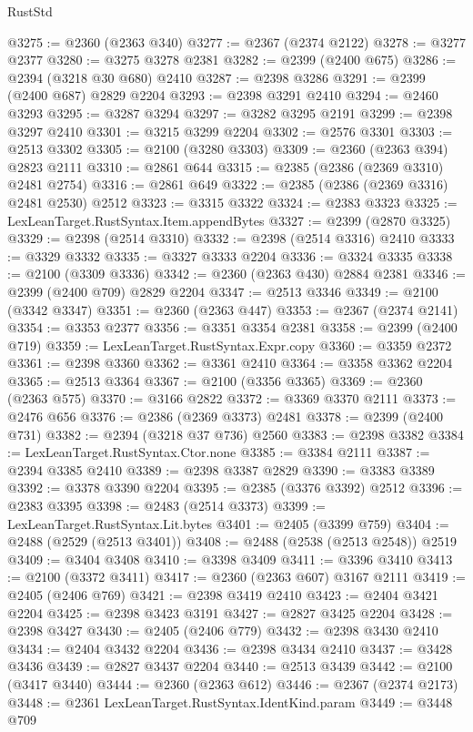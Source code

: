 \begin{lexlean}{RustStd}
\begin{coremodule}
@3275 := @2360 (@2363 @340)
@3277 := @2367 (@2374 @2122)
@3278 := @3277 @2377
@3280 := @3275 @3278 @2381
@3282 := @2399 (@2400 @675)
@3286 := @2394 (@3218 @30 @680) @2410
@3287 := @2398 @3286
@3291 := @2399 (@2400 @687) @2829 @2204
@3293 := @2398 @3291 @2410
@3294 := @2460 @3293
@3295 := @3287 @3294
@3297 := @3282 @3295 @2191
@3299 := @2398 @3297 @2410
@3301 := @3215 @3299 @2204
@3302 := @2576 @3301
@3303 := @2513 @3302
@3305 := @2100 (@3280 @3303)
@3309 := @2360 (@2363 @394) @2823 @2111
@3310 := @2861 @644
@3315 := @2385 (@2386 (@2369 @3310) @2481 @2754)
@3316 := @2861 @649
@3322 := @2385 (@2386 (@2369 @3316) @2481 @2530) @2512
@3323 := @3315 @3322
@3324 := @2383 @3323
@3325 := LexLeanTarget.RustSyntax.Item.appendBytes
@3327 := @2399 (@2870 @3325)
@3329 := @2398 (@2514 @3310)
@3332 := @2398 (@2514 @3316) @2410
@3333 := @3329 @3332
@3335 := @3327 @3333 @2204
@3336 := @3324 @3335
@3338 := @2100 (@3309 @3336)
@3342 := @2360 (@2363 @430) @2884 @2381
@3346 := @2399 (@2400 @709) @2829 @2204
@3347 := @2513 @3346
@3349 := @2100 (@3342 @3347)
@3351 := @2360 (@2363 @447)
@3353 := @2367 (@2374 @2141)
@3354 := @3353 @2377
@3356 := @3351 @3354 @2381
@3358 := @2399 (@2400 @719)
@3359 := LexLeanTarget.RustSyntax.Expr.copy
@3360 := @3359 @2372
@3361 := @2398 @3360
@3362 := @3361 @2410
@3364 := @3358 @3362 @2204
@3365 := @2513 @3364
@3367 := @2100 (@3356 @3365)
@3369 := @2360 (@2363 @575)
@3370 := @3166 @2822
@3372 := @3369 @3370 @2111
@3373 := @2476 @656
@3376 := @2386 (@2369 @3373) @2481
@3378 := @2399 (@2400 @731)
@3382 := @2394 (@3218 @37 @736) @2560
@3383 := @2398 @3382
@3384 := LexLeanTarget.RustSyntax.Ctor.none
@3385 := @3384 @2111
@3387 := @2394 @3385 @2410
@3389 := @2398 @3387 @2829
@3390 := @3383 @3389
@3392 := @3378 @3390 @2204
@3395 := @2385 (@3376 @3392) @2512
@3396 := @2383 @3395
@3398 := @2483 (@2514 @3373)
@3399 := LexLeanTarget.RustSyntax.Lit.bytes
@3401 := @2405 (@3399 @759)
@3404 := @2488 (@2529 (@2513 @3401))
@3408 := @2488 (@2538 (@2513 @2548)) @2519
@3409 := @3404 @3408
@3410 := @3398 @3409
@3411 := @3396 @3410
@3413 := @2100 (@3372 @3411)
@3417 := @2360 (@2363 @607) @3167 @2111
@3419 := @2405 (@2406 @769)
@3421 := @2398 @3419 @2410
@3423 := @2404 @3421 @2204
@3425 := @2398 @3423 @3191
@3427 := @2827 @3425 @2204
@3428 := @2398 @3427
@3430 := @2405 (@2406 @779)
@3432 := @2398 @3430 @2410
@3434 := @2404 @3432 @2204
@3436 := @2398 @3434 @2410
@3437 := @3428 @3436
@3439 := @2827 @3437 @2204
@3440 := @2513 @3439
@3442 := @2100 (@3417 @3440)
@3444 := @2360 (@2363 @612)
@3446 := @2367 (@2374 @2173)
@3448 := @2361 LexLeanTarget.RustSyntax.IdentKind.param
@3449 := @3448 @709

\end{coremodule}
\end{lexlean}
